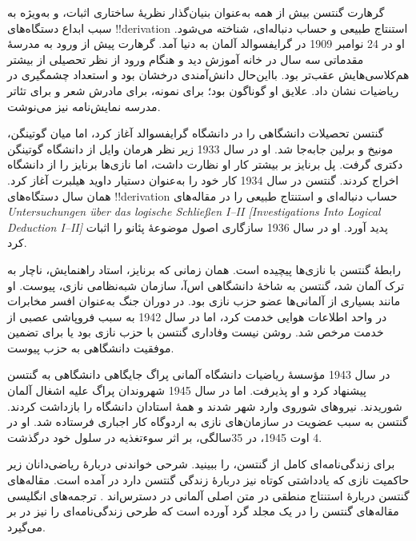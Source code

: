 \documentclass[../../../include/open-logic-section]{subfiles}
\begin{document}



گرهارت گنتسن بیش از همه به‌عنوان بنیان‌گذار نظریهٔ ساختاری اثبات، و
به‌ویژه به سبب ابداع دستگاه‌های !!{derivation} استنتاج طبیعی و حساب
دنباله‌ای، شناخته می‌شود. او در 24 نوامبر 1909 در گرایفسوالد آلمان به
دنیا آمد. گرهارت پیش از ورود به مدرسهٔ مقدماتی سه سال در خانه آموزش
دید و هنگام ورود از نظر تحصیلی از بیشتر هم‌کلاسی‌هایش عقب‌تر بود.
بااین‌حال دانش‌آمندی درخشان بود و استعداد چشمگیری در ریاضیات نشان داد.
علایق او گوناگون بود؛ برای نمونه، برای مادرش شعر و برای تئاتر مدرسه
نمایش‌نامه نیز می‌نوشت.

گنتسن تحصیلات دانشگاهی را در دانشگاه گرایفسوالد آغاز کرد، اما میان
گوتینگن، مونیخ و برلین جابه‌جا شد. او در سال 1933 زیر نظر هرمان وایل از
دانشگاه گوتینگن دکتری گرفت. پل برنایز بر بیشتر کار او نظارت داشت، اما
نازی‌ها برنایز را از دانشگاه اخراج کردند. گنتسن در سال 1934 کار خود را
به‌عنوان دستیار داوید هیلبرت آغاز کرد. همان سال دستگاه‌های
!!{derivation} حساب دنباله‌ای و استنتاج طبیعی را در مقاله‌های
\emph{Untersuchungen \"{u}ber das logische Schlie\ss en I--II
  [Investigations Into Logical Deduction I--II]} پدید آورد. او در سال
1936 سازگاری اصول موضوعهٔ پئانو را اثبات کرد.

رابطهٔ گنتسن با نازی‌ها پیچیده است. همان زمانی که برنایز، استاد
راهنمایش، ناچار به ترک آلمان شد، گنتسن به شاخهٔ دانشگاهی اس‌آ، سازمان
شبه‌نظامی نازی، پیوست. او مانند بسیاری از آلمانی‌ها عضو حزب نازی بود.
در دوران جنگ به‌عنوان افسر مخابرات در واحد اطلاعات هوایی خدمت کرد،
اما در سال 1942 به سبب فروپاشی عصبی از خدمت مرخص شد. روشن نیست وفاداری
گنتسن با حزب نازی بود یا برای تضمین موفقیت دانشگاهی به حزب پیوست.

در سال 1943 مؤسسهٔ ریاضیات دانشگاه آلمانی پراگ جایگاهی دانشگاهی به
گنتسن پیشنهاد کرد و او پذیرفت. اما در سال 1945 شهروندان پراگ علیه
اشغال آلمان شوریدند. نیروهای شوروی وارد شهر شدند و همهٔ استادان
دانشگاه را بازداشت کردند. گنتسن به سبب عضویت در سازمان‌های نازی به
اردوگاه کار اجباری فرستاده شد. او در 4 اوت 1945، در 35سالگی، بر اثر
سوءتغذیه در سلول خود درگذشت.

\begin{reading}
برای زندگی‌نامه‌ای کامل از گنتسن، \citet{Menzler-Trott2007} را ببینید.
شرحی خواندنی دربارهٔ ریاضی‌دانان زیر حاکمیت نازی که یادداشتی کوتاه نیز
دربارهٔ زندگی گنتسن دارد در \citet{Segal2014} آمده است. مقاله‌های
گنتسن دربارهٔ استنتاج منطقی در متن اصلی آلمانی در دسترس‌اند
\citep{Gentzen1935a,Gentzen1935b}. ترجمه‌های انگلیسی مقاله‌های گنتسن
را \citet{Gentzen1969} در یک مجلد گرد آورده است که طرحی زندگی‌نامه‌ای
را نیز در بر می‌گیرد.
\end{reading}
\end{document}
